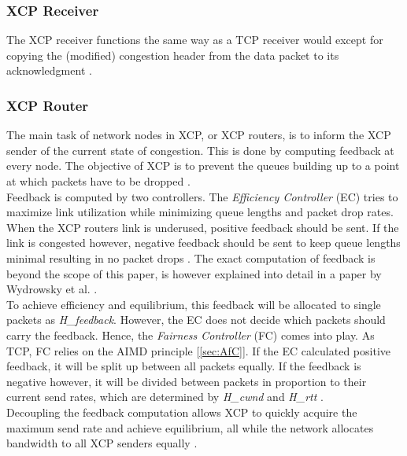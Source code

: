 \documentclass[a4paper,conference]{IEEEtran}
\begin{document}
\subsubsection*{XCP Receiver}
The XCP receiver functions the same way as a TCP receiver would except for copying the (modified) congestion header from the data packet to its acknowledgment \cite{katabi2002congestion}.

\subsubsection*{XCP Router}
The main task of network nodes in XCP, or XCP routers, is to inform the XCP sender of the current state of congestion. This is done by computing feedback at every node. The objective of XCP is to prevent the queues building up to a point at which packets have to be dropped \cite{katabi2002congestion}.\\
Feedback is computed by two controllers. The \textit{Efficiency Controller} (EC) tries to maximize link utilization while minimizing queue lengths and packet drop rates. When the XCP routers link is underused, positive feedback should be sent. If the link is congested however, negative feedback should be sent to keep queue lengths minimal resulting in no packet drops \cite{katabi2002congestion,1498331}. The exact computation of feedback is beyond the scope of this paper, is however explained into detail in a paper by Wydrowsky et al. \cite{1498331}.\\
To achieve efficiency and equilibrium, this feedback will be allocated to single packets as \textit{H\_feedback}. However, the EC does not decide which packets should carry the feedback. Hence, the \textit{Fairness Controller} (FC) comes into play. As TCP, FC relies on the AIMD principle [\autoref{sec:AfC}]. If the EC calculated positive feedback, it will be split up between all packets equally. If the feedback is negative however, it will be divided between packets in proportion to their current send rates, which are determined by \textit{H\_cwnd} and \textit{H\_rtt} \cite{katabi2002congestion,1498331}.\\
Decoupling the feedback computation allows XCP to quickly acquire the maximum send rate and achieve equilibrium, all while the network allocates bandwidth to all XCP senders equally \cite{katabi2002congestion}.
\end{document}
